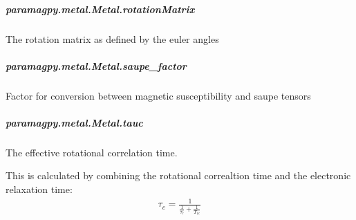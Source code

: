 \documentclass[a4paper,10pt,english,openany,oneside]{sphinxmanual}
\begin{document}
\begin{fulllineitems}
\begin{fulllineitems}
\begin{fulllineitems}
\end{fulllineitems}



\subparagraph{paramagpy.metal.Metal.rotationMatrix}
\label{\detokenize{reference/generated/paramagpy.metal.Metal.rotationMatrix:paramagpy-metal-metal-rotationmatrix}}\label{\detokenize{reference/generated/paramagpy.metal.Metal.rotationMatrix::doc}}

\begin{fulllineitems}
\label{\detokenize{reference/generated/paramagpy.metal.Metal.rotationMatrix:paramagpy.metal.Metal.rotationMatrix}}
The rotation matrix as defined by the euler angles

\end{fulllineitems}



\subparagraph{paramagpy.metal.Metal.saupe\_factor}
\label{\detokenize{reference/generated/paramagpy.metal.Metal.saupe_factor:paramagpy-metal-metal-saupe-factor}}\label{\detokenize{reference/generated/paramagpy.metal.Metal.saupe_factor::doc}}

\begin{fulllineitems}
\label{\detokenize{reference/generated/paramagpy.metal.Metal.saupe_factor:paramagpy.metal.Metal.saupe_factor}}
Factor for conversion between magnetic susceptibility
and saupe tensors

\end{fulllineitems}



\subparagraph{paramagpy.metal.Metal.tauc}
\label{\detokenize{reference/generated/paramagpy.metal.Metal.tauc:paramagpy-metal-metal-tauc}}\label{\detokenize{reference/generated/paramagpy.metal.Metal.tauc::doc}}

\begin{fulllineitems}
\label{\detokenize{reference/generated/paramagpy.metal.Metal.tauc:paramagpy.metal.Metal.tauc}}
The effective rotational correlation time.

This is calculated by combining the rotational correaltion time
and the electronic relaxation time:
\begin{equation*}
\begin{split}\tau_c = \frac{1}{\frac{1}{\tau_r}+\frac{1}{T_{1e}}}\end{split}
\end{equation*}
\end{fulllineitems}




\end{fulllineitems}
\end{fulllineitems}
\end{document}
